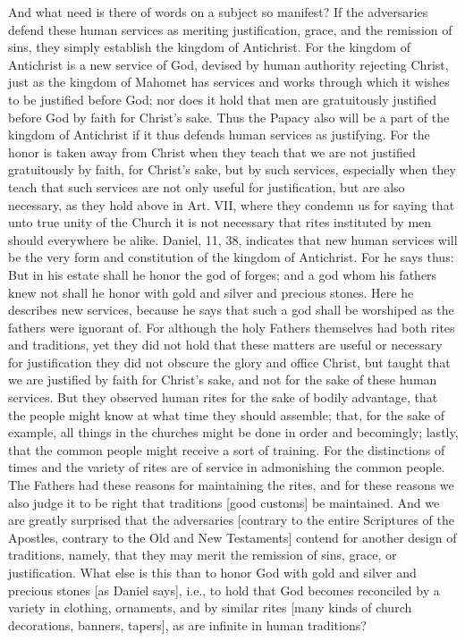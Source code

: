 And what need is there of words on a subject so manifest?  If the
adversaries defend these human services as meriting justification,
grace, and the remission of sins, they simply establish the kingdom
of Antichrist.  For the kingdom of Antichrist is a new service of God,
devised by human authority rejecting Christ, just as the kingdom of
Mahomet has services and works through which it wishes to be
justified before God; nor does it hold that men are gratuitously
justified before God by faith for Christ's sake.  Thus the Papacy
also will be a part of the kingdom of Antichrist if it thus defends
human services as justifying.  For the honor is taken away from
Christ when they teach that we are not justified gratuitously by
faith, for Christ's sake, but by such services, especially when they
teach that such services are not only useful for justification, but
are also necessary, as they hold above in Art.  VII, where they
condemn us for saying that unto true unity of the Church it is not
necessary that rites instituted by men should everywhere be alike.
Daniel, 11, 38, indicates that new human services will be the very
form and constitution of the kingdom of Antichrist.  For he says thus:
But in his estate shall he honor the god of forges; and a god whom
his fathers knew not shall he honor with gold and silver and precious
stones.  Here he describes new services, because he says that such a
god shall be worshiped as the fathers were ignorant of.  For although
the holy Fathers themselves had both rites and traditions, yet they
did not hold that these matters are useful or necessary for
justification they did not obscure the glory and office Christ, but
taught that we are justified by faith for Christ's sake, and not for
the sake of these human services.  But they observed human rites for
the sake of bodily advantage, that the people might know at what time
they should assemble; that, for the sake of example, all things in
the churches might be done in order and becomingly; lastly, that the
common people might receive a sort of training.  For the distinctions
of times and the variety of rites are of service in admonishing the
common people.  The Fathers had these reasons for maintaining the
rites, and for these reasons we also judge it to be right that
traditions [good customs] be maintained.  And we are greatly
surprised that the adversaries [contrary to the entire Scriptures of
the Apostles, contrary to the Old and New Testaments] contend for
another design of traditions, namely, that they may merit the
remission of sins, grace, or justification.  What else is this than
to honor God with gold and silver and precious stones [as Daniel
says], i.e., to hold that God becomes reconciled by a variety in
clothing, ornaments, and by similar rites [many kinds of church
decorations, banners, tapers], as are infinite in human traditions?

